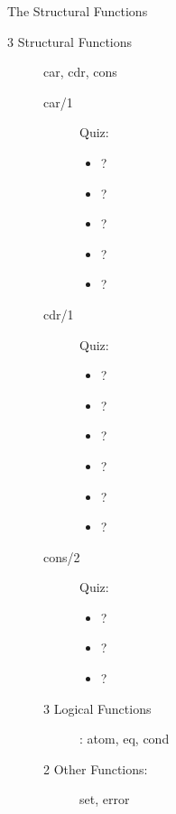\documentclass[fleqn]{beamer}
\begin{document}
\begin{frame}{The Structural Functions}
\begin{description}
  \item[3 Structural Functions] car, cdr, cons
    \begin{description}
      \item[car/1] Quiz:
        \begin{itemize}
          \item {}?
          \item {}?
          \item {}?
          \item {}?
          \item {}?
        \end{itemize}
      \item[cdr/1] Quiz:
        \begin{itemize}
          \item {}?
          \item {}?
          \item {}?
          \item {}?
          \item {}?
          \item {}?
        \end{itemize}
      \item[cons/2] Quiz:
        \begin{itemize}
          \item {}?
          \item {}?
          \item {}?
        \end{itemize}
      \item[3 Logical Functions]: atom, eq, cond
      \item[2 Other Functions:] set, error
    \end{description}
\end{description}


\end{frame}
\end{document}
